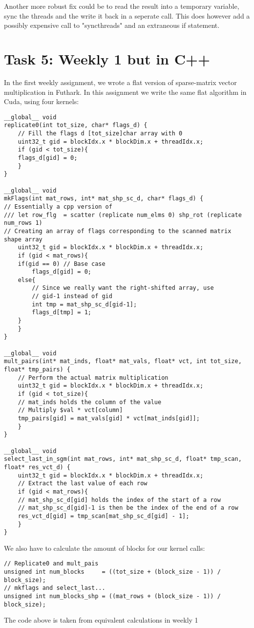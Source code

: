 \documentclass[11pt]{article}
\begin{document}
Another more robust fix could be to read the result into a temporary variable,
sync the threads and the write it back in a seperate call. This does
however add a possibly expensive call to "syncthreads" and an extraneous
if statement.

\section{Task 5: Weekly 1 but in C++}
\label{sec:orgd270d1d}
In the first weekly assignment, we wrote a flat version of sparse-matrix
vector multiplication in Futhark. In this assignment we write the same
flat algorithm in Cuda, using four kernels: 
\begin{verbatim}
__global__ void
replicate0(int tot_size, char* flags_d) {
    // Fill the flags d [tot_size]char array with 0
    uint32_t gid = blockIdx.x * blockDim.x + threadIdx.x;
    if (gid < tot_size){
	flags_d[gid] = 0;
    }
}

__global__ void
mkFlags(int mat_rows, int* mat_shp_sc_d, char* flags_d) {
// Essentially a cpp version of
/// let row_flg  = scatter (replicate num_elms 0) shp_rot (replicate num_rows 1)
// Creating an array of flags corresponding to the scanned matrix shape array
    uint32_t gid = blockIdx.x * blockDim.x + threadIdx.x;
    if (gid < mat_rows){
	if(gid == 0) // Base case
	    flags_d[gid] = 0;
	else{
	    // Since we really want the right-shifted array, use 
	    // gid-1 instead of gid
	    int tmp = mat_shp_sc_d[gid-1];
	    flags_d[tmp] = 1;
	}
    }
}

__global__ void 
mult_pairs(int* mat_inds, float* mat_vals, float* vct, int tot_size, float* tmp_pairs) {
    // Perform the actual matrix multiplication
    uint32_t gid = blockIdx.x * blockDim.x + threadIdx.x;
    if (gid < tot_size){
	// mat_inds holds the column of the value
	// Multiply $val * vct[column]
	tmp_pairs[gid] = mat_vals[gid] * vct[mat_inds[gid]];
    }
}

__global__ void
select_last_in_sgm(int mat_rows, int* mat_shp_sc_d, float* tmp_scan, float* res_vct_d) {
    uint32_t gid = blockIdx.x * blockDim.x + threadIdx.x;
    // Extract the last value of each row
    if (gid < mat_rows){
	// mat_shp_sc_d[gid] holds the index of the start of a row
	// mat_shp_sc_d[gid]-1 is then be the index of the end of a row
	res_vct_d[gid] = tmp_scan[mat_shp_sc_d[gid] - 1];
    }
}
\end{verbatim}

We also have to calculate the amount of blocks for our kernel calls:
\begin{verbatim}
// Replicate0 and mult_pais
unsigned int num_blocks     = ((tot_size + (block_size - 1)) / block_size);
// mkflags and select_last...
unsigned int num_blocks_shp = ((mat_rows + (block_size - 1)) / block_size);  
\end{verbatim}
The code above is taken from equivalent calculations in weekly 1
\end{document}

